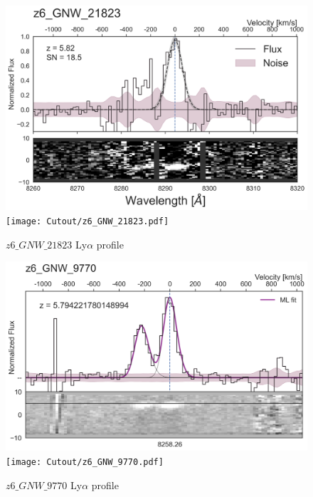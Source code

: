 \documentclass[12pt,english]{article}
\begin{document}
\clearpage
\begin{figure}
\begin{center}\includegraphics[width=12cm, trim=0.1cm 0cm 0cm -1cm]{LyaProfiles/z6_GNW_21823.png}
\texttt{[image: Cutout/z6\_GNW\_21823.pdf]}
\caption{$z6\_GNW\_21823$ Ly$\alpha$ profile}
\end{center}
\end{figure}
\clearpage
\begin{figure}
\begin{center}\includegraphics[width=12cm, trim=0.1cm 0cm 0cm -1cm]{LyaProfiles/z6_GNW_9770.png}
\texttt{[image: Cutout/z6\_GNW\_9770.pdf]}
\caption{$z6\_GNW\_9770$ Ly$\alpha$ profile}
\end{center}
\end{figure}
\clearpage
\end{document}
